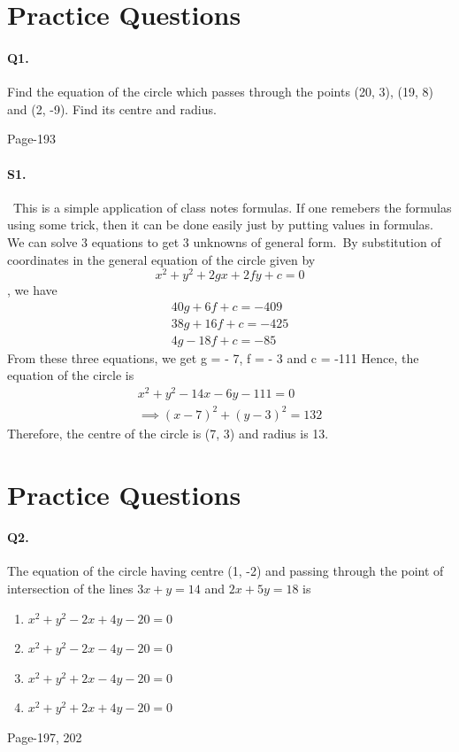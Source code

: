 \documentclass{article}
\begin{document}
\section*{Practice Questions}
\paragraph{Q1.}Find the equation of the circle which passes through the points (20, 3),
(19, 8) and (2, -9). Find its centre and radius.
\begin{flushright}
Page-193
\end{flushright}
\paragraph{S1.}\
This is a simple application of class notes formulas. If one remebers the formulas using some trick, then it can be done easily just by putting values in formulas. We can solve 3 equations to get 3 unknowns of general form.\
By substitution of coordinates in the general equation of the  circle given by
$$x^2 + y^2 + 2gx + 2fy + c = 0$$, we have
\begin{align*}
    40g + 6f + c = - 409\\
    38g + 16 f + c = - 425\\
    4g - 18 f + c = - 85
\end{align*}
From these three equations, we get
g = - 7, f = - 3 and c = -111
Hence, the equation of the circle is
\begin{align*}
    x^2 + y^2 - 14x - 6y - 111 = 0\\
    \implies (x - 7)^2 + (y - 3)^2 = 132
\end{align*}
Therefore, the centre of the circle is (7, 3) and radius is 13.

\clearpage
\section*{Practice Questions}
\paragraph{Q2.}The equation of the circle having centre (1, -2) and passing through the
point of intersection of the lines $3x + y = 14$ and $2x + 5y = 18$ is\
\begin{enumerate}
    \item $x^2 + y^2 - 2x + 4y - 20 = 0$
    \item $x^2 + y^2 - 2x - 4y - 20 = 0$
    \item $x^2 + y^2 + 2x - 4y - 20 = 0$
    \item $x^2 + y^2 + 2x + 4y - 20 = 0$
\end{enumerate}
\begin{flushright}
    Page-197, 202
\end{flushright}
\end{document}
